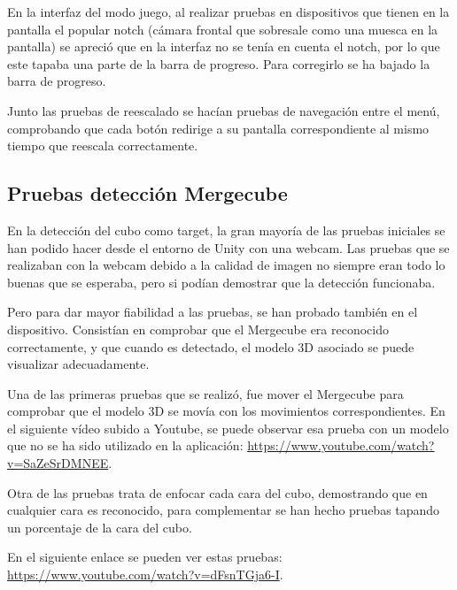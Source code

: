 En la interfaz del modo juego, al realizar pruebas en dispositivos que tienen en la pantalla el popular notch (cámara frontal que sobresale como una muesca en la pantalla) se apreció que en la interfaz no se tenía en cuenta el notch, por lo que este tapaba una parte de la barra de progreso. Para corregirlo se ha bajado la barra de progreso.

Junto las pruebas de reescalado se hacían pruebas de navegación entre el menú, comprobando que cada botón redirige a su pantalla correspondiente al mismo tiempo que reescala correctamente.


\subsection{Pruebas detección Mergecube}
En la detección del cubo como target, la gran mayoría de las pruebas iniciales se han podido hacer desde el entorno de Unity con una webcam. Las pruebas que se realizaban con la webcam debido a la calidad de imagen no siempre eran todo lo buenas que se esperaba, pero si podían demostrar que la detección funcionaba.

Pero para dar mayor fiabilidad a las pruebas, se han probado también en el dispositivo. Consistían en comprobar que el Mergecube era reconocido correctamente, y que cuando es detectado, el modelo 3D asociado se puede visualizar adecuadamente.

Una de las primeras pruebas que se realizó, fue mover el Mergecube para comprobar que el modelo 3D se movía con los movimientos correspondientes. En el siguiente vídeo subido a Youtube, se puede observar esa prueba con un modelo que no se ha sido utilizado en la aplicación: \url{https://www.youtube.com/watch?v=SaZeSrDMNEE}.

Otra de las pruebas trata de enfocar cada cara del cubo, demostrando que en cualquier cara es reconocido, para complementar se han hecho pruebas tapando un porcentaje de la cara del cubo. 

En el siguiente enlace se pueden ver estas pruebas:\\ \url{https://www.youtube.com/watch?v=dFsnTGja6-I}.

